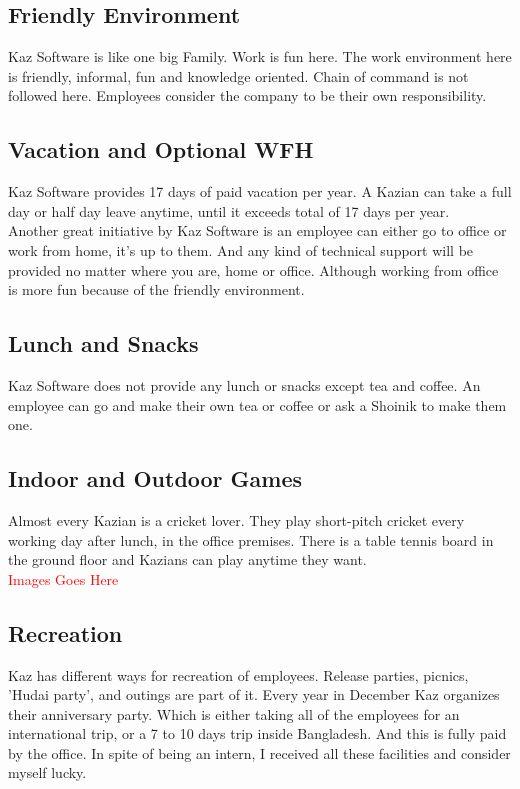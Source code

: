 \subsection{Friendly Environment}

Kaz Software is like one big Family.
Work is fun here.
The work environment here is friendly, informal, fun and knowledge oriented.
Chain of command is not followed here.
Employees consider the company to be their own responsibility.

\subsection{Vacation and Optional WFH}

Kaz Software provides 17 days of paid vacation per year. 
A Kazian can take a full day or half day leave anytime, until it exceeds total of 17 days per year.\\

Another great initiative by Kaz Software is an employee can either go to office or work from home, it's up to them.
And any kind of technical support will be provided no matter where you are, home or office.
Although working from office is more fun because of the friendly environment.

\subsection{Lunch and Snacks}

Kaz Software does not provide any lunch or snacks except tea and coffee.
An employee can go and make their own tea or coffee or ask a Shoinik to make them one.

\subsection{Indoor and Outdoor Games}

Almost every Kazian is a cricket lover.
They play short-pitch cricket every working day after lunch, in the office premises.
There is a table tennis board in the ground floor and Kazians can play anytime they want.
\\

\textcolor{red}{\LARGE Images Goes Here}

\subsection{Recreation}

Kaz has different ways for recreation of employees.
Release parties, picnics, ’Hudai party’, and outings are part of it.
Every year in December Kaz organizes their anniversary party.
Which is either taking all of the employees for an international trip, or a 7 to 10 days trip inside Bangladesh.
And this is fully paid by the office.
In spite of being an intern, I received all these facilities and consider myself lucky.
\\

